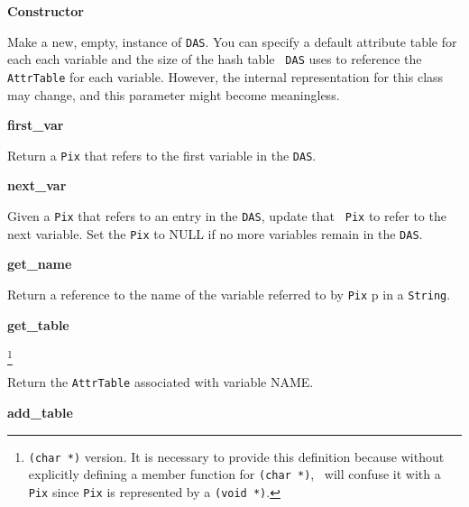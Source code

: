 \begin{description} \item {\bf Constructor}


Make a new, empty, instance of {\tt DAS}. You can specify a default
attribute table for each each variable and the size of the hash table {\tt
DAS} uses to reference the {\tt AttrTable} for each variable. However, the
internal representation for this class may change, and this parameter might
become meaningless.

\item {\bf first\_var}


Return a {\tt Pix} that refers to the first variable in the {\tt DAS}.

\item {\bf next\_var}


Given a {\tt Pix} that refers to an entry in the {\tt DAS}, update that {\tt
Pix} to refer to the next variable. Set the {\tt Pix} to NULL if no more
variables remain in the {\tt DAS}.

\item {\bf get\_name}


Return a reference to the name of the variable referred to by {\tt Pix} p in
a {\tt String}.

\item {\bf get\_table}


\footnote{{\tt (char
*)} version. It is necessary to provide this definition because without
explicitly defining a member function for {\tt (char *)}, \Cpp\ will confuse
it with a {\tt Pix} since {\tt Pix} is represented by a {\tt (void *)}.}

Return the {\tt AttrTable} associated with variable NAME.

\item {\bf add\_table}



\end{description}
